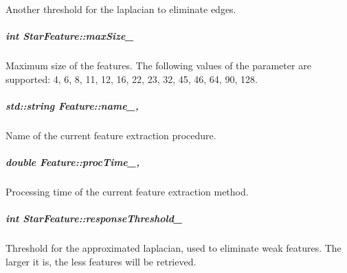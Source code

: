 Another threshold for the laplacian to eliminate edges. 

\hypertarget{group___feature_extractor_a03553a6b73fb075fa1bc1813b91b2079}{
\subparagraph[{max\-Size\-\_\-}]{\setlength{\rightskip}{0pt plus 5cm}int Star\-Feature\-::max\-Size\-\_\-\hspace{0.3cm}{\ttfamily [private]}}}\label{group___feature_extractor_a03553a6b73fb075fa1bc1813b91b2079}


Maximum size of the features. The following values of the parameter are supported\-: 4, 6, 8, 11, 12, 16, 22, 23, 32, 45, 46, 64, 90, 128. 

\hypertarget{group___feature_extractor_a46e9fc1f327aaafb10de2c0425d311aa}{
\subparagraph[{name\-\_\-}]{\setlength{\rightskip}{0pt plus 5cm}std\-::string Feature\-::name\-\_\-\hspace{0.3cm}{\ttfamily [protected]}, {\ttfamily [inherited]}}}\label{group___feature_extractor_a46e9fc1f327aaafb10de2c0425d311aa}


Name of the current feature extraction procedure. 

\hypertarget{group___feature_extractor_a1b176bd48aad30b553e0f87f0264c3d0}{
\subparagraph[{proc\-Time\-\_\-}]{\setlength{\rightskip}{0pt plus 5cm}double Feature\-::proc\-Time\-\_\-\hspace{0.3cm}{\ttfamily [protected]}, {\ttfamily [inherited]}}}\label{group___feature_extractor_a1b176bd48aad30b553e0f87f0264c3d0}


Processing time of the current feature extraction method. 

\hypertarget{group___feature_extractor_a85a6ef809bb695a64de0bb5d4121e28a}{
\subparagraph[{response\-Threshold\-\_\-}]{\setlength{\rightskip}{0pt plus 5cm}int Star\-Feature\-::response\-Threshold\-\_\-\hspace{0.3cm}{\ttfamily [private]}}}\label{group___feature_extractor_a85a6ef809bb695a64de0bb5d4121e28a}


Threshold for the approximated laplacian, used to eliminate weak features. The larger it is, the less features will be retrieved. 

